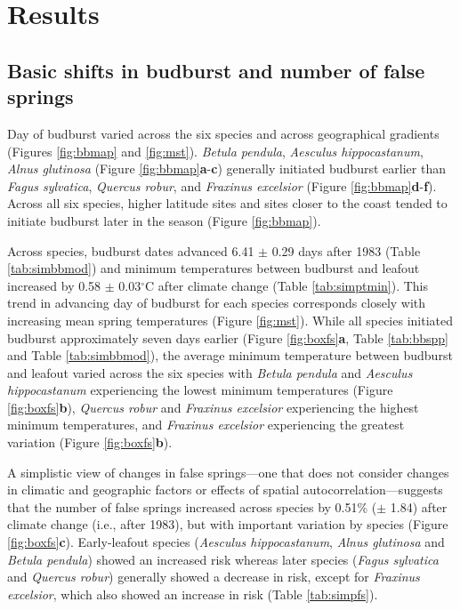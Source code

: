 \documentclass{article}\usepackage[]{graphicx}\usepackage[]{color}
\begin{document}
\section*{Results} %
\subsection*{Basic shifts in budburst and number of false springs}
Day of budburst varied across the six species and across geographical gradients (Figures \ref{fig:bbmap} and \ref{fig:mst}). \textit{Betula pendula}, \textit{Aesculus hippocastanum}, \textit{Alnus glutinosa} (Figure \ref{fig:bbmap}\textbf{a}-\textbf{c}) generally initiated budburst earlier than \textit{Fagus sylvatica}, \textit{Quercus robur}, and \textit{Fraxinus excelsior} (Figure \ref{fig:bbmap}\textbf{d}-\textbf{f}). Across all six species, higher latitude sites and sites closer to the coast tended to initiate budburst later in the season (Figure \ref{fig:bbmap}).  

Across species, budburst dates advanced 6.41 $\pm$ 0.29 days after 1983 (Table \ref{tab:simbbmod}) and minimum temperatures between budburst and leafout increased by 0.58 $\pm$ 0.03$^{\circ}$C after climate change (Table \ref{tab:simptmin}). This trend in advancing day of budburst for each species corresponds closely with increasing mean spring temperatures (Figure \ref{fig:mst}). While all species initiated budburst approximately seven days earlier (Figure \ref{fig:boxfs}\textbf{a}, Table \ref{tab:bbspp} and Table \ref{tab:simbbmod}), the average minimum temperature between budburst and leafout varied across the six species with \textit{Betula pendula} and \textit{Aesculus hippocastanum} experiencing the lowest minimum temperatures (Figure \ref{fig:boxfs}\textbf{b}), \textit{Quercus robur} and \textit{Fraxinus excelsior} experiencing the highest minimum temperatures, and \textit{Fraxinus excelsior} experiencing the greatest variation (Figure \ref{fig:boxfs}\textbf{b}). 

A simplistic view of changes in false springs---one that does not consider changes in climatic and geographic factors or effects of spatial autocorrelation---suggests that the number of false springs increased across species by 0.51\% ($\pm$ 1.84) after climate change (i.e., after 1983), but with important variation by species (Figure \ref{fig:boxfs}\textbf{c}). Early-leafout species (\textit{Aesculus hippocastanum}, \textit{Alnus glutinosa} and \textit{Betula pendula}) showed an increased risk whereas later species (\textit{Fagus sylvatica} and \textit{Quercus robur}) generally showed a decrease in risk, except for \textit{Fraxinus excelsior}, which also showed an increase in risk (Table \ref{tab:simpfs}). 
\end{document}
